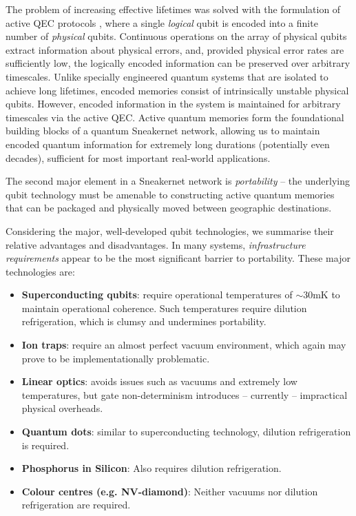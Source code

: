 \documentclass[twocolumn, aps, rmp, amsmath, amssymb, nofootinbib, superscriptaddress, longbibliography, floatfix, table-of-contents, eqsecnum]{revtex4-2}
\begin{document}
The problem of increasing effective lifetimes was solved with the formulation of active QEC protocols \cite{SD-Devitt:2013aa}, where a single \textit{logical} qubit is encoded into a finite number of \textit{physical} qubits. Continuous operations on the array of physical qubits extract information about physical errors, and, provided physical error rates are sufficiently low, the logically encoded information can be preserved over arbitrary timescales. Unlike specially engineered quantum systems that are isolated to achieve long lifetimes, encoded memories consist of intrinsically unstable physical qubits. However, encoded information in the system is maintained for arbitrary timescales via the active QEC. Active quantum memories form the foundational building blocks of a quantum Sneakernet network, allowing us to maintain encoded quantum information for extremely long durations (potentially even decades), sufficient for most important real-world applications.

The second major element in a Sneakernet network is \textit{portability} -- the underlying qubit technology must be amenable to constructing active quantum memories that can be packaged and physically moved between geographic destinations. 

Considering the major, well-developed qubit technologies, we summarise their relative advantages and disadvantages. In many systems, \textit{infrastructure requirements} appear to be the most significant barrier to portability. These major technologies are:
\begin{itemize}
\item \textbf{Superconducting qubits}: require operational temperatures of $\sim$30mK to maintain operational coherence. Such temperatures require dilution refrigeration, which is clumsy and undermines portability. 
\item \textbf{Ion traps}: require an almost perfect vacuum environment, which again may prove to be implementationally problematic. 
\item \textbf{Linear optics}: avoids issues such as vacuums and extremely low temperatures, but gate non-determinism introduces -- currently -- impractical physical overheads. 
\item \textbf{Quantum dots}: similar to superconducting technology, dilution refrigeration is required.
\item \textbf{Phosphorus in Silicon}: Also requires dilution refrigeration. 
\item \textbf{Colour centres (e.g. NV-diamond)}: Neither vacuums nor dilution refrigeration are required. 
\end{itemize}
\end{document}
